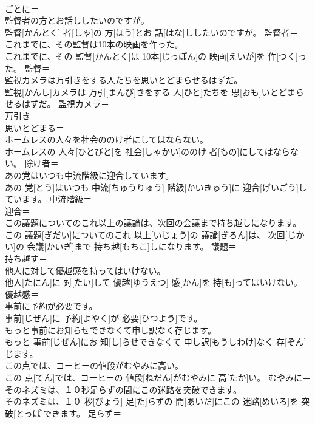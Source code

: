 \documentclass[8pt]{extreport}
\begin{document}
\begin{CJK}{UTF8}{min}
\\	ごとに＝ 
\\	監督者の方とお話ししたいのですが。	
\\	監督[かんとく] 者[しゃ]の 方[ほう]とお 話[はな]ししたいのですが。	監督者＝ 
\\	これまでに、その監督は10本の映画を作った。	
\\	これまでに、その 監督[かんとく]は 10本[じっぽん]の 映画[えいが]を 作[つく]った。	監督＝ 
\\	監視カメラは万引きをする人たちを思いとどまらせるはずだ。	
\\	監視[かんし]カメラは 万引[まんび]きをする 人[ひと]たちを 思[おも]いとどまらせるはずだ。	監視カメラ＝ 
\\	万引き＝ 
\\	思いとどまる＝ 
\\	ホームレスの人々を社会ののけ者にしてはならない。	
\\	ホームレスの 人々[ひとびと]を 社会[しゃかい]ののけ 者[もの]にしてはならない。	除け者＝ 
\\	あの党はいつも中流階級に迎合しています。	
\\	あの 党[とう]はいつも 中流[ちゅうりゅう] 階級[かいきゅう]に 迎合[げいごう]しています。	中流階級＝ 
\\	迎合＝ 
\\	この議題についてのこれ以上の議論は、次回の会議まで持ち越しになります。	
\\	この 議題[ぎだい]についてのこれ 以上[いじょう]の 議論[ぎろん]は、 次回[じかい]の 会議[かいぎ]まで 持ち越[もちこ]しになります。	議題＝ 
\\	持ち越す＝ 
\\	他人に対して優越感を持ってはいけない。	
\\	他人[たにん]に 対[たい]して 優越[ゆうえつ] 感[かん]を 持[も]ってはいけない。	優越感＝ 
\\	事前に予約が必要です。	
\\	事前[じぜん]に 予約[よやく]が 必要[ひつよう]です。	
\\	もっと事前にお知らせできなくて申し訳なく存じます。	
\\	もっと 事前[じぜん]にお 知[し]らせできなくて 申し訳[もうしわけ]なく 存[ぞん]じます。	
\\	この点では、コーヒーの値段がむやみに高い。	
\\	この 点[てん]では、コーヒーの 値段[ねだん]がむやみに 高[たか]い。	むやみに＝ 
\\	そのネズミは、１０秒足らずの間にこの迷路を突破できます。	
\\	そのネズミは、１０ 秒[びょう] 足[た]らずの 間[あいだ]にこの 迷路[めいろ]を 突破[とっぱ]できます。	足らず＝ 

\end{CJK}
\end{document}
